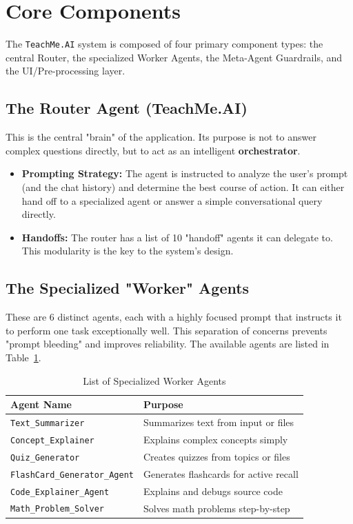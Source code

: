 \documentclass{article}
\begin{document}
\section{Core Components}
The \texttt{TeachMe.AI} system is composed of four primary component types: the central Router, the specialized Worker Agents, the Meta-Agent Guardrails, and the UI/Pre-processing layer.

\subsection{The Router Agent (TeachMe.AI)}
This is the central "brain" of the application. Its purpose is not to answer complex questions directly, but to act as an intelligent \textbf{orchestrator}.
\begin{itemize}
    \item \textbf{Prompting Strategy:} The agent is instructed to analyze the user's prompt (and the chat history) and determine the best course of action. It can either hand off to a specialized agent or answer a simple conversational query directly.
    \item \textbf{Handoffs:} The router has a list of 10 "handoff" agents it can delegate to. This modularity is the key to the system's design.
\end{itemize}

\subsection{The Specialized "Worker" Agents}
These are 6 distinct agents, each with a highly focused prompt that instructs it to perform one task exceptionally well. This separation of concerns prevents "prompt bleeding" and improves reliability. The available agents are listed in Table~\ref{tab:agents}.

\begin{table}[h!]
\centering
\caption{List of Specialized Worker Agents}
\label{tab:agents}
\begin{tabular}{@{}ll@{}}
\toprule
Agent Name & Purpose \\ \midrule
\texttt{Text\_Summarizer} & Summarizes text from input or files \\
\texttt{Concept\_Explainer} & Explains complex concepts simply \\
\texttt{Quiz\_Generator} & Creates quizzes from topics or files \\
\texttt{FlashCard\_Generator\_Agent} & Generates flashcards for active recall \\
\texttt{Code\_Explainer\_Agent} & Explains and debugs source code \\
\texttt{Math\_Problem\_Solver} & Solves math problems step-by-step \\
\bottomrule
\end{tabular}
\end{table}
\end{document}
